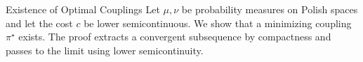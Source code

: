 \documentclass[aspectratio=169]{beamer}
\begin{document}
\begin{frame}{Existence of Optimal Couplings}
  Let $\mu,\nu$ be probability measures on Polish spaces and let the cost $c$ be
  lower semicontinuous. We show that a minimizing coupling $\pi^\star$ exists.
  The proof extracts a convergent subsequence by compactness and passes to the
  limit using lower semicontinuity.
\end{frame}
\end{document}
